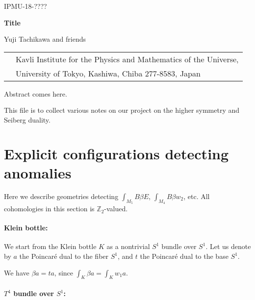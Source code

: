 \documentclass[12pt]{article}
\numberwithin{equation}{section}
\def\bZ{\mathbb{Z}}
\begin{document}
\begin{titlepage}

\begin{flushright}
IPMU-18-????
\end{flushright}

\vskip 3cm

\begin{center}

{\Large \bfseries Title}


\vskip 1cm
Yuji Tachikawa and friends
\vskip 1cm

\begin{tabular}{ll}
 & Kavli Institute for the Physics and Mathematics of the Universe, \\
& University of Tokyo,  Kashiwa, Chiba 277-8583, Japan
\end{tabular}


\vskip 1cm

\end{center}


\noindent
Abstract comes here.

\end{titlepage}

\setcounter{tocdepth}{2}
\tableofcontents

\newpage

\fi

This file is to collect various notes on our project on the higher symmetry and Seiberg duality.

\section{Explicit configurations detecting anomalies}

Here we describe geometries detecting $\int_{M_5} B\beta E$, $\int_{M_4} B\beta w_2$, etc.
All cohomologies in this section is $\bZ_2$-valued.



\paragraph{Klein bottle:}

We start from the Klein bottle $K$ as a nontrivial $S^1$ bundle over $S^1$.
Let us denote by $a$ the Poincar\'e dual to the fiber $S^1$,
and $t$ the Poincar\'e dual to the base $S^1$.

We have $\beta a=ta$, since $\int_K \beta a = \int_K w_1 a$.

\paragraph{$T^4$ bundle over $S^1$:}
\end{document}
